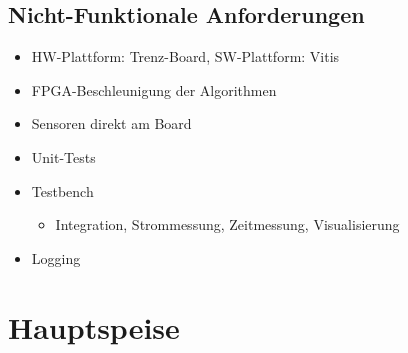 \documentclass{beamer}
\begin{document}
\subsection{Nicht-Funktionale Anforderungen}
\begin{frame}{\subsecname}
\begin{itemize}
\item{HW-Plattform: Trenz-Board, SW-Plattform: Vitis}
\item{FPGA-Beschleunigung der Algorithmen}
\item{Sensoren direkt am Board}
\item{Unit-Tests}
\item{Testbench}
\begin{itemize}
\item{Integration, Strommessung, Zeitmessung, Visualisierung}
\end{itemize}
\item{Logging}
\end{itemize}
\end{frame}



\section{Hauptspeise}
\begin{frame}{}
\begin{center}
\end{center}
\end{frame}
\end{document}
